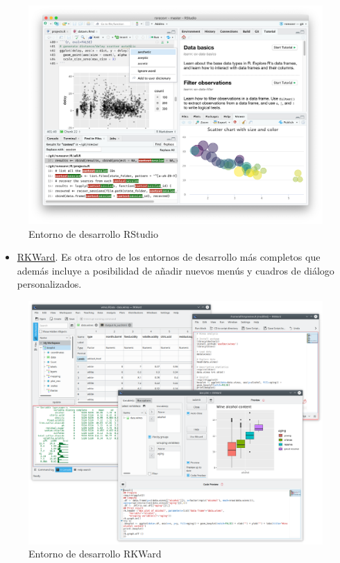 \documentclass[
  a4paper,
]{scrreport}
\providecommand{\tightlist}{%
  \setlength{\itemsep}{0pt}\setlength{\parskip}{0pt}}\usepackage{longtable,booktabs,array}
\theoremstyle{definition}
\theoremstyle{remark}
\begin{document}
\begin{figure}[H]

{\centering \includegraphics[width=8.33333in,height=\textheight,keepaspectratio]{img/rstudio.png}

}

\caption{Entorno de desarrollo RStudio}

\end{figure}%

\begin{itemize}
\tightlist
\item
  \href{https://rkward.kde.org}{RKWard}. Es otra otro de los entornos de
  desarrollo más completos que además incluye a posibilidad de añadir
  nuevos menús y cuadros de diálogo personalizados.
\end{itemize}

\begin{figure}[H]

{\centering \includegraphics[width=8.33333in,height=\textheight,keepaspectratio]{img/rkward.png}

}

\caption{Entorno de desarrollo RKWard}

\end{figure}%
\end{document}

